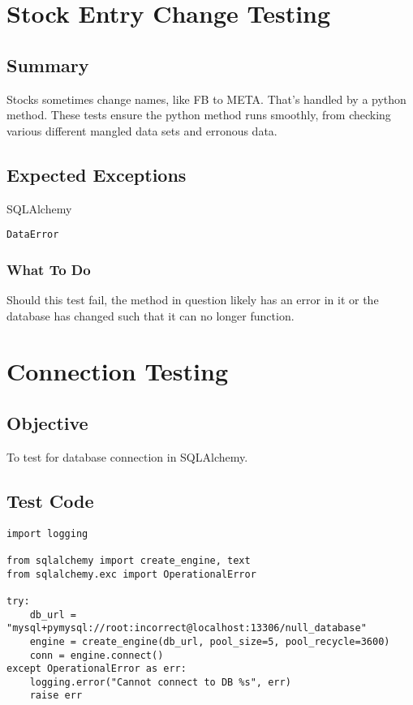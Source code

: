 \documentclass[12pt]{article}
\begin{document}
\section{Stock Entry Change Testing}

\subsection{Summary}

Stocks sometimes change names, like FB to META. That's handled by a python method. These tests ensure the python method runs smoothly, from checking various different mangled data sets and erronous data.

\subsection{Expected Exceptions}

SQLAlchemy 

\begin{verbatim}
DataError
\end{verbatim}

\subsubsection{What To Do}

Should this test fail, the method in question likely has an error in it or the database has changed such that it can no longer function.

\section{Connection Testing}

\subsection{Objective}

To test for database connection in SQLAlchemy.

\subsection{Test Code}

\begin{verbatim}
import logging

from sqlalchemy import create_engine, text
from sqlalchemy.exc import OperationalError

try:
    db_url = "mysql+pymysql://root:incorrect@localhost:13306/null_database"
    engine = create_engine(db_url, pool_size=5, pool_recycle=3600)
    conn = engine.connect()
except OperationalError as err:
    logging.error("Cannot connect to DB %s", err)
    raise err

\end{verbatim}
\end{document}
